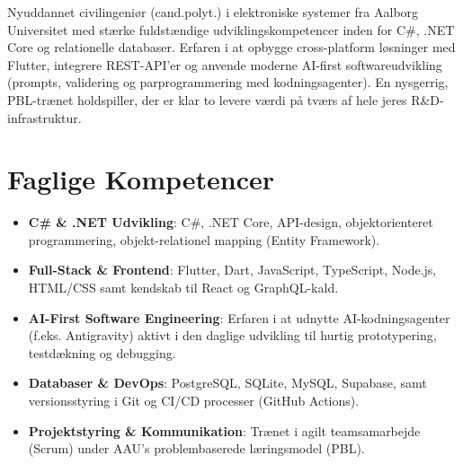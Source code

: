 \documentclass[11pt,a4paper,sans]{moderncv}
\begin{document}
\makecvtitle


\vspace{6pt}
\small{Nyuddannet civilingeniør (cand.polyt.) i elektroniske systemer fra Aalborg Universitet med stærke fuldstændige udviklingskompetencer inden for C\#, .NET Core og relationelle databaser. Erfaren i at opbygge cross-platform løsninger med Flutter, integrere REST-API'er og anvende moderne AI-first softwareudvikling (prompts, validering og parprogrammering med kodningsagenter). En nysgerrig, PBL-trænet holdspiller, der er klar to levere værdi på tværs af hele jeres R\&D-infrastruktur.}


\section{Faglige Kompetencer}
\vspace{1pt}
\begin{itemize}

\item \textbf{C\# \& .NET Udvikling}: C\#, .NET Core, API-design, objektorienteret programmering, objekt-relationel mapping (Entity Framework).

\item \textbf{Full-Stack \& Frontend}: Flutter, Dart, JavaScript, TypeScript, Node.js, HTML/CSS samt kendskab til React og GraphQL-kald.

\item \textbf{AI-First Software Engineering}: Erfaren i at udnytte AI-kodningsagenter (f.eks. Antigravity) aktivt i den daglige udvikling til hurtig prototypering, testdækning og debugging.

\item \textbf{Databaser \& DevOps}: PostgreSQL, SQLite, MySQL, Supabase, samt versionsstyring i Git og CI/CD processer (GitHub Actions).

\item \textbf{Projektstyring \& Kommunikation}: Trænet i agilt teamsamarbejde (Scrum) under AAU's problembaserede læringsmodel (PBL).

\end{itemize}

\end{document}
